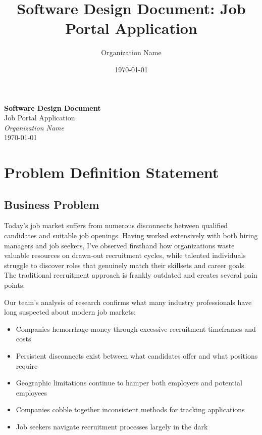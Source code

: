 \documentclass[12pt,a4paper]{article}
\title{Software Design Document: Job Portal Application}
\author{Organization Name}
\date{\today}
\begin{document}
\begin{titlepage}
    \centering
    \vspace*{1cm}
    {\huge\bfseries Software Design Document\\}
    \vspace{1.5cm}
    {\LARGE Job Portal Application\\}
    \vspace{2cm}
    {\Large\itshape Organization Name\\}
    \vfill
    {\large \today\\}
\end{titlepage}

\tableofcontents
\newpage

\section{Problem Definition Statement}

\subsection{Business Problem}
Today's job market suffers from numerous disconnects between qualified candidates and suitable job openings. Having worked extensively with both hiring managers and job seekers, I've observed firsthand how organizations waste valuable resources on drawn-out recruitment cycles, while talented individuals struggle to discover roles that genuinely match their skillsets and career goals. The traditional recruitment approach is frankly outdated and creates several pain points.

Our team's analysis of \citet{linkedin2022} research confirms what many industry professionals have long suspected about modern job markets:

\begin{itemize}
    \item Companies hemorrhage money through excessive recruitment timeframes and costs
    \item Persistent disconnects exist between what candidates offer and what positions require
    \item Geographic limitations continue to hamper both employers and potential employees
    \item Companies cobble together inconsistent methods for tracking applications
    \item Job seekers navigate recruitment processes largely in the dark
\end{itemize}
\end{document}
